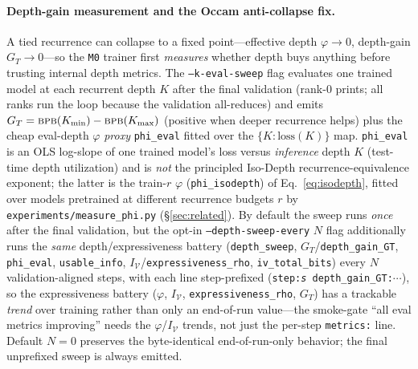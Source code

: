 \documentclass[11pt]{article}
\newcommand{\bpb}{\textsc{bpb}}
\newcommand{\code}[1]{\texttt{#1}}
\begin{document}
\paragraph{Depth-gain measurement and the Occam anti-collapse fix.}
A tied recurrence can collapse to a fixed point---effective depth \(\varphi\to 0\), depth-gain
\(G_T\to 0\)---so the \code{M0} trainer first \emph{measures} whether depth buys anything before
trusting internal depth metrics.  The \code{--k-eval-sweep} flag evaluates one trained model at each
recurrent depth \(K\) after the final validation (rank-0 prints; all ranks run the loop because the
validation all-reduces) and emits \(G_T=\bpb(K_{\min})-\bpb(K_{\max})\) (positive when deeper
recurrence helps) plus the cheap eval-depth \(\varphi\) \emph{proxy} \code{phi\_eval} fitted over the
\(\{K:\text{loss}(K)\}\) map.  \code{phi\_eval} is an OLS log-slope of one trained model's loss versus
\emph{inference} depth \(K\) (test-time depth utilization) and is \emph{not} the principled Iso-Depth
recurrence-equivalence exponent; the latter is the train-\(r\) \(\varphi\) (\code{phi\_isodepth}) of
Eq.~\eqref{eq:isodepth}, fitted over models pretrained at different recurrence budgets \(r\) by
\code{experiments/measure\_phi.py} (\S\ref{sec:related}).
By default the sweep runs \emph{once} after the final validation, but the opt-in \code{--depth-sweep-every}
\(N\) flag additionally runs the \emph{same} depth/expressiveness battery (\code{depth\_sweep},
\(G_T\)/\code{depth\_gain\_GT}, \code{phi\_eval}, \code{usable\_info}, \(I_{\mathcal V}\)/\code{expressiveness\_rho},
\code{iv\_total\_bits}) every \(N\) validation-aligned steps, with each line step-prefixed
(\code{step:\textit{s} depth\_gain\_GT:\(\cdots\)}), so the expressiveness battery (\(\varphi\), \(I_{\mathcal V}\),
\code{expressiveness\_rho}, \(G_T\)) has a trackable \emph{trend} over training rather than only an
end-of-run value---the smoke-gate ``all eval metrics improving'' needs the \(\varphi\)/\(I_{\mathcal V}\)
trends, not just the per-step \code{metrics:} line. Default \(N=0\) preserves the byte-identical
end-of-run-only behavior; the final unprefixed sweep is always emitted.
\end{document}
